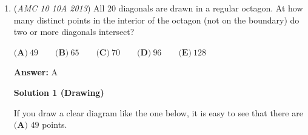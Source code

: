 \begin{enumerate}
Now we fill in $B$'s match for $Q$ and $R$. Notice how that for each a) and b) there is only one way to fill in $B$'s match for $Q$ and $R$. For a), if we put $BX$ in $Q$, then $BZ$ must be in $R$. But $AZ$ is already in $R$, which makes it impossible. For b), if we put $BY$ in $Q$, $BX$ must be in $R$. Then, $CY$ has to be in both $P$ and $R$ which is impossible. So there is only one way to fill in $B$'s match for $Q$ and $R$.

 a)

 \begin{verbatim}
$P$---->$AX$ $BY$$Q$---->$AY$ $BZ$$R$---->$AZ$ $BX$
\end{verbatim}

b)

 \begin{verbatim}
$P$---->$AX$ $BZ$$Q$---->$AY$ $BX$$R$---->$AZ$ $BY$
\end{verbatim}

Now we fill in $C$'s matchs:

 a)

 \begin{verbatim}
$P$---->$AX$ $BY$ $CZ$$Q$---->$AY$ $BZ$ $CX$$R$---->$AZ$ $BX$ $CY$
\end{verbatim}

b)

 \begin{verbatim}
$P$---->$AX$ $BZ$ $CY$$Q$---->$AY$ $BX$ $CZ$$R$---->$AZ$ $BY$ $CX$
\end{verbatim}

There are 2 $PPQQRR$s, therefore 90 must be added twice.

 \href{https://artofproblemsolving.com/videos/amc/2013amc10a/358}{https://artofproblemsolving.com/videos/amc/2013amc10a/358}

 


	\item (\textit{AMC 10 10A 2013}) All 20 diagonals are drawn in a regular octagon. At how many distinct points in the interior
of the octagon (not on the boundary) do two or more diagonals intersect?


 $\textbf{(A)}\ 49\qquad\textbf{(B)}\ 65\qquad\textbf{(C)}\ 70\qquad\textbf{(D)}\ 96\qquad\textbf{(E)}\ 128$

 \textbf{Answer: }A



\textbf{Solution 1 (Drawing)}

If you draw a clear diagram like the one below, it is easy to see that there are $\boxed{\textbf{(A) }49}$ points.


\end{enumerate}
